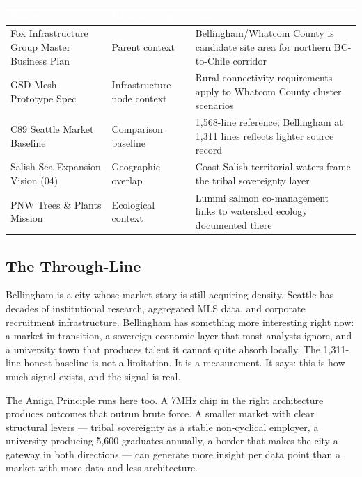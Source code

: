 \documentclass[11pt,letterpaper]{article}
\newcommand{\tableheader}[1]{\textbf{\sffamily\textcolor{white}{#1}}}
\begin{document}
\begin{center}
\begin{tabularx}{\textwidth}{L{4cm}L{4cm}X}
\toprule
{}
\tableheader{Document} & \tableheader{Relationship} & \tableheader{Notes} \\
\midrule
Fox Infrastructure Group Master Business Plan & Parent context & Bellingham/Whatcom County is candidate site area for northern BC-to-Chile corridor \\
GSD Mesh Prototype Spec & Infrastructure node context & Rural connectivity requirements apply to Whatcom County cluster scenarios \\
C89 Seattle Market Baseline & Comparison baseline & 1,568-line reference; Bellingham at 1,311 lines reflects lighter source record \\
Salish Sea Expansion Vision (04) & Geographic overlap & Coast Salish territorial waters frame the tribal sovereignty layer \\
PNW Trees \& Plants Mission & Ecological context & Lummi salmon co-management links to watershed ecology documented there \\
\bottomrule
\end{tabularx}
\end{center}

\subsection{The Through-Line}

Bellingham is a city whose market story is still acquiring density. Seattle has decades of institutional research, aggregated MLS data, and corporate recruitment infrastructure. Bellingham has something more interesting right now: a market in transition, a sovereign economic layer that most analysts ignore, and a university town that produces talent it cannot quite absorb locally. The 1,311-line honest baseline is not a limitation. It is a measurement. It says: this is how much signal exists, and the signal is real.

The Amiga Principle runs here too. A 7MHz chip in the right architecture produces outcomes that outrun brute force. A smaller market with clear structural levers --- tribal sovereignty as a stable non-cyclical employer, a university producing 5,600 graduates annually, a border that makes the city a gateway in both directions --- can generate more insight per data point than a market with more data and less architecture.
\end{document}
